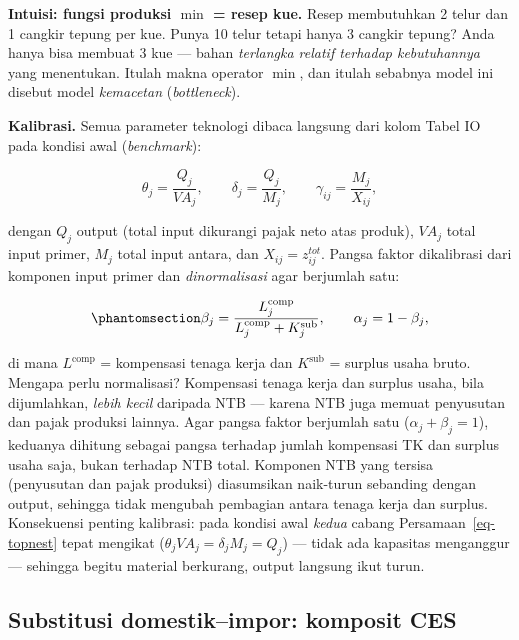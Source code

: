 \documentclass[
  manuscript=article,
  layout=publish,
  year=2026,
  volume=1,
]{den}
\begin{document}
\begin{intuisi}

\textbf{Intuisi: fungsi produksi \(\min\) = resep kue.} Resep
membutuhkan 2 telur dan 1 cangkir tepung per kue. Punya 10 telur tetapi
hanya 3 cangkir tepung? Anda hanya bisa membuat 3 kue --- bahan
\emph{terlangka relatif terhadap kebutuhannya} yang menentukan. Itulah
makna operator \(\min\), dan itulah sebabnya model ini disebut model
\emph{kemacetan} (\emph{bottleneck}).

\end{intuisi}

\textbf{Kalibrasi.} Semua parameter teknologi dibaca langsung dari kolom
Tabel IO pada kondisi awal (\emph{benchmark}):

\[
\theta_j = \frac{Q_j}{VA_j}, \qquad
\delta_j = \frac{Q_j}{M_j}, \qquad
\gamma_{ij} = \frac{M_j}{X_{ij}},
\]

dengan \(Q_j\) output (total input dikurangi pajak neto atas produk),
\(VA_j\) total input primer, \(M_j\) total input antara, dan
\(X_{ij} = z^{tot}_{ij}\). Pangsa faktor dikalibrasi dari komponen input
primer dan \emph{dinormalisasi} agar berjumlah satu:

\begin{equation}\phantomsection\label{eq-shares}{
\beta_j = \frac{L_j^{\text{comp}}}{L_j^{\text{comp}} + K_j^{\text{sub}}},
\qquad \alpha_j = 1 - \beta_j,
}\end{equation}

di mana \(L^{\text{comp}}\) = kompensasi tenaga kerja dan
\(K^{\text{sub}}\) = surplus usaha bruto. Mengapa perlu normalisasi?
Kompensasi tenaga kerja dan surplus usaha, bila dijumlahkan, \emph{lebih
kecil} daripada NTB --- karena NTB juga memuat penyusutan dan pajak
produksi lainnya. Agar pangsa faktor berjumlah satu (\(\alpha_j +
\beta_j = 1\)), keduanya dihitung sebagai pangsa terhadap jumlah
kompensasi TK dan surplus usaha saja, bukan terhadap NTB total. Komponen
NTB yang tersisa (penyusutan dan pajak produksi) diasumsikan naik-turun
sebanding dengan output, sehingga tidak mengubah pembagian antara tenaga
kerja dan surplus. Konsekuensi penting kalibrasi: pada kondisi awal
\emph{kedua} cabang Persamaan~\ref{eq-topnest} tepat mengikat
(\(\theta_j VA_j = \delta_j M_j = Q_j\)) --- tidak ada kapasitas
menganggur --- sehingga begitu material berkurang, output langsung ikut
turun.

\subsection{Substitusi domestik--impor: komposit CES}\label{sec-ces}
\end{document}

